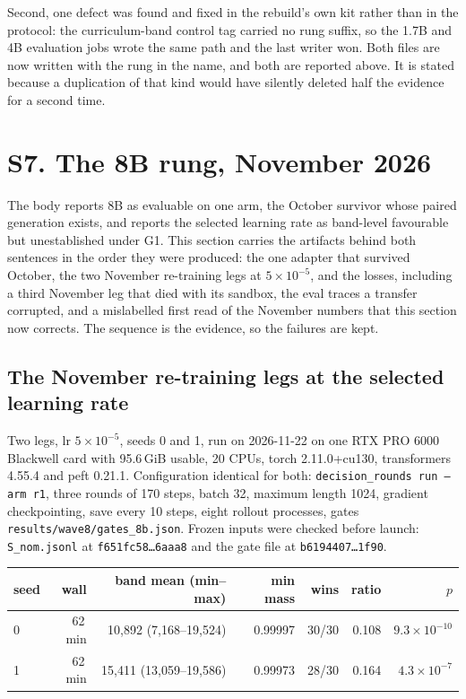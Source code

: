 \documentclass[11pt,a4paper]{article}
\begin{document}
Second, one defect was found and fixed in the rebuild's own kit rather than in the protocol: the
curriculum-band control tag carried no rung suffix, so the 1.7B and 4B evaluation jobs wrote the same
path and the last writer won. Both files are now written with the rung in the name, and both are
reported above. It is stated because a duplication of that kind would have silently deleted half the
evidence for a second time.


\section{S7. The 8B rung, November 2026}\label{sec:s7}

The body reports 8B as evaluable on one arm, the October survivor whose paired generation exists,
and reports the selected learning rate as band-level favourable but unestablished under G1. This
section carries the artifacts behind both sentences in the order they were produced: the one adapter
that survived October, the two November re-training legs at $5\times10^{-5}$, and the losses,
including a third November leg that died with its sandbox, the eval traces a transfer corrupted, and
a mislabelled first read of the November numbers that this section now corrects. The sequence is the
evidence, so the failures are kept.

\subsection*{The November re-training legs at the selected learning rate}

Two legs, lr $5\times10^{-5}$, seeds 0 and 1, run on 2026-11-22 on one RTX PRO 6000 Blackwell
card with 95.6\,GiB usable, 20 CPUs, torch 2.11.0+cu130, transformers 4.55.4 and peft 0.21.1.
Configuration identical for both: \texttt{decision\_rounds run --arm r1}, three rounds of 170
steps, batch 32, maximum length 1024, gradient checkpointing, save every 10 steps, eight rollout
processes, gates \texttt{results/wave8/gates\_8b.json}. Frozen inputs were checked before launch:
\texttt{S\_nom.jsonl} at \texttt{f651fc58\ldots6aaa8} and the gate file at \texttt{b6194407\ldots1f90}.

\begin{center}\small
\begin{tabular}{lrrrrrr}
\hline
seed & wall & band mean (min--max) & min mass & wins & ratio & $p$ \\
\hline
0 & 62\,min & 10{,}892 (7{,}168--19{,}524) & 0.99997 & 30/30 & 0.108 & $9.3\times10^{-10}$ \\
1 & 62\,min & 15{,}411 (13{,}059--19{,}586) & 0.99973 & 28/30 & 0.164 & $4.3\times10^{-7}$ \\
\hline
\end{tabular}
\end{center}
\end{document}
